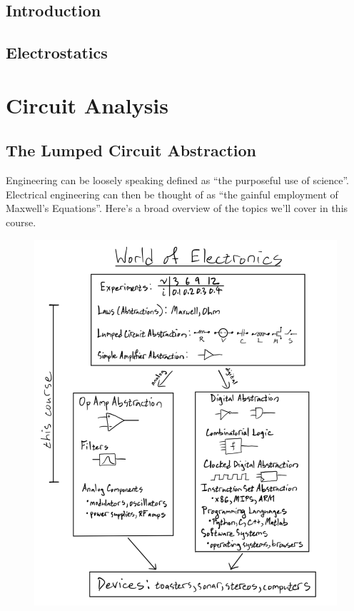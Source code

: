 \documentclass[
  letterpaper,
  DIV=11,
  numbers=noendperiod]{scrreprt}
\begin{document}
\hypertarget{introduction}{%
\chapter{Introduction}\label{introduction}}

\hypertarget{electrostatics}{%
\chapter{Electrostatics}\label{electrostatics}}

\part{Circuit Analysis}

\hypertarget{the-lumped-circuit-abstraction}{%
\chapter{The Lumped Circuit
Abstraction}\label{the-lumped-circuit-abstraction}}

Engineering can be loosely speaking defined as ``the purposeful use of
science''. Electrical engineering can then be thought of as ``the
gainful employment of Maxwell's Equations''. Here's a broad overview of
the topics we'll cover in this course.

\begin{figure}

{\centering \includegraphics[width=5.20833in,height=\textheight]{circuits/./resources/image-20230212045712110.png}

}

\end{figure}
\end{document}
